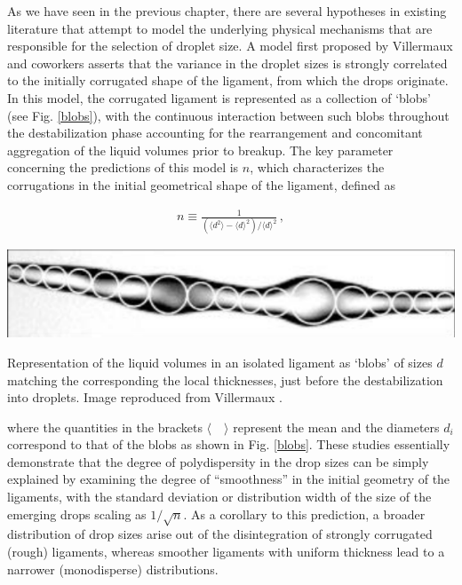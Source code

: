 As we have seen in the previous chapter, there are several hypotheses 
in existing literature  
that attempt to model the underlying physical mechanisms 
that are responsible for the selection of droplet size. 
A model first proposed by Villermaux and coworkers 
asserts that the variance in the droplet sizes is strongly 
correlated to the initially corrugated shape of the 
ligament, from which the drops originate. 
In this model, the corrugated ligament is represented as a collection 
of `blobs' (see Fig. \ref{blobs}), with the continuous interaction between 
such blobs throughout the destabilization phase accounting for the 
rearrangement and concomitant aggregation of the liquid volumes prior to breakup. 
The key parameter concerning the predictions of this model 
is $n$, which characterizes the corrugations in the initial 
geometrical shape of the ligament, defined as  

\begin{align}
	n \equiv \frac{1}{\left(\langle d^{2} \rangle - \langle d \rangle^{2} \right) / \langle d \rangle^{2}} \, ,  
\end{align}

\begin{marginfigure}
\centering
\includegraphics{plots/ligament_breakup/lig_protoblobs.png}
\caption{Representation of the liquid volumes in an isolated ligament as `blobs'
	of sizes $d$ matching the corresponding the local thicknesses, 
	just before the destabilization into droplets. 
	Image reproduced from Villermaux \cite{vill_1}.
	}
\label{blobs}
\end{marginfigure}


where the quantities in the brackets $\langle \quad \rangle$ represent the mean
and the diameters $d_i$ correspond to that of the blobs as shown in Fig. \ref{blobs}.
These studies essentially demonstrate that the degree of polydispersity 
in the drop sizes can be simply explained by examining the 
degree of ``smoothness'' in the initial geometry of the ligaments, 
with the standard deviation or distribution width of the size of the 
emerging drops scaling as $1 / \sqrt{n}$. 
As a corollary to this prediction, a broader distribution of drop sizes arise out
of the disintegration of strongly corrugated (rough) ligaments, whereas smoother 
ligaments with uniform thickness lead to a narrower (monodisperse) distributions. 


